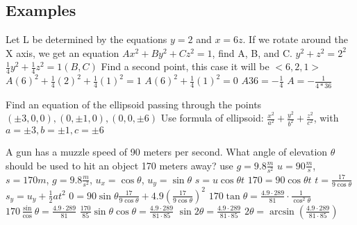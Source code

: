 \documentclass[12pt]{article}
\begin{document}
\begin{paracol}{2}
        \section*{Examples}
        \begin{fleqn}
            Let L be determined by the equations $y=2$ and $x=6z$. If we rotate around the X axis, we get an equation
            \newline
            $Ax^2 + By^2 + Cz^2 = 1$, find A, B, and C.\newline
            $y^2 + z^2 = 2^2$ \guillemotright $\frac{1}{4}y^2 + \frac{1}{4}z^2 = 1  (B,C)$ \newline
            Find a second point, this case it will be $<6,2,1>$ \newline
            $A(6)^2 + \frac{1}{4}(2)^2 + \frac{1}{4}(1)^2 = 1$ \guillemotright $A(6)^2 + \frac{1}{4}(1)^2 = 0$ \newline
            $A36 = - \frac{1}{4}$ \guillemotright $A = - \frac{1}{4*36}$ \newline
        \end{fleqn}
        \newline
        \begin{fleqn}
            Find an equation of the ellipsoid passing through the points \newline
            $(\pm3,0,0),(0,\pm1,0),(0,0,\pm6) $ \newline
            Use formula of ellipsoid: $\frac{x^2}{a^2} + \frac{y^2}{b^2} + \frac{z^2}{c^2}$, with $a=\pm3, b=\pm1, c=\pm 6$
        \end{fleqn}
        \newline
        \newline
        \newline
        \switchcolumn
        \begin{fleqn}
            A gun has a muzzle speed of 90 meters per second. What angle of elevation $\theta$ should be used to hit an object
            170 meters away? use $g=9.8 \frac{m}{s^2}$ \newline
            $u=90\frac{m}{s}$, $s=170m$, $g=9.8\frac{m}{s^2}$, $u_x=\cos\theta$, $u_y=\sin\theta$ \newline
            $s = u\cos\theta t$ \guillemotright
            $170=90\cos\theta t$ \guillemotright
            $t=\frac{17}{9\cos\theta}$\newline
            $s_y=u_y + \frac{1}{2}at^2$ \guillemotright
            $0=90\sin\theta \frac{17}{9\cos\theta} + 4.9 (\frac{17}{9\cos\theta})^2$ \newline
            $170\tan\theta = \frac{4.9 \cdot 289}{81} \cdot \frac{1}{\cos^2\theta}$ \guillemotright
            $170 \frac{\sin}{\cos}\theta = \frac{4.9\cdot289}{81}$ \newline
            $\frac{170}{85}\sin\theta\cos\theta = \frac{4.9\cdot289}{81\cdot85}$ \guillemotright
            $\sin 2\theta = \frac{4.9\cdot289}{81\cdot85}$ \newline
            $2 \theta = \arcsin(\frac{4.9\cdot289}{81\cdot85})$ \newline
        \end{fleqn}

        \newpage

    \end{paracol}
\end{document}

